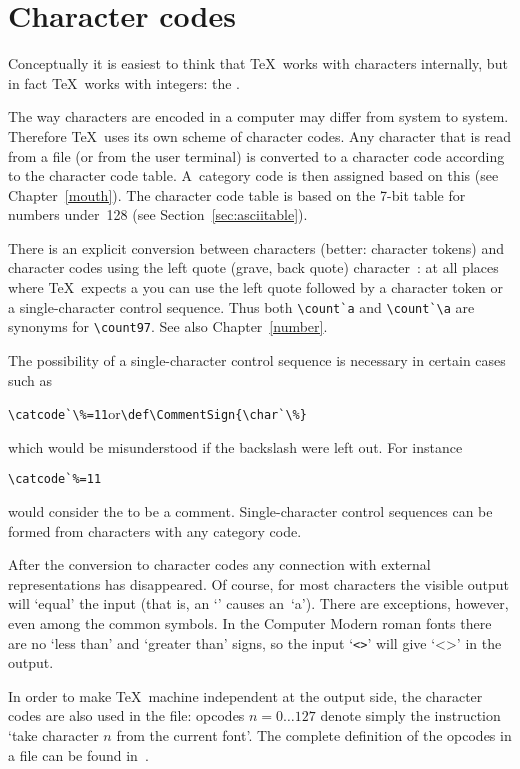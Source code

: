 \section{Character codes}
\label{char:code}

Conceptually it is easiest to think that \TeX\ works with
characters internally, but in fact
\TeX\ works with integers: the . 

The way characters are encoded in a computer may differ
from system to system.
Therefore \TeX\ uses its own scheme of character codes.
Any character that is read from a file (or from the user terminal)
is converted to a character code according to the
character code table.
A~category code is then assigned based on this (see Chapter~\ref{mouth}).
The character code table is based on the 7-bit \ascii{} table
for numbers under~128 (see Section~\ref{sec:asciitable}).

There is an explicit conversion between characters
(better:  character tokens)
and  character codes  using the left quote (grave, back quote)
character~:
at all places where \TeX\ expects a  you
can use the left quote followed by a character
token or
a single-character control sequence.
Thus both \verb.\count`a. and \verb.\count`\a. are synonyms
for \verb.\count97.. See also Chapter~\ref{number}.

The possibility of a single-character control
sequence is necessary in certain cases such as
\begin{disp}\verb>\catcode`\%=11>\quad or\quad \verb>\def\CommentSign{\char`\%}>\end{disp}
which would be misunderstood if the backslash were left out.
For instance
\begin{verbatim}
\catcode`%=11
\end{verbatim}
would consider
the  to be a comment.
Single-character
control sequences can be formed from characters with any
category code.

After the conversion to character codes any connection
with external representations has disappeared. Of course,
for most characters  the visible output will `equal' the input
(that is, an `' causes an~`a').
There are exceptions, however, even among the common symbols.
In the Computer Modern
roman fonts there are no `less than' and `greater than'
%
signs, so the input `\verb.<>.' will give `<>' in the output.

In order to make \TeX\ machine independent at the output
side, the character codes are also used in the  file:
opcodes $n=0\ldots127$ denote simply the instruction `take
character $n$ from the current font'. The complete definition
of the opcodes in a  file can be found in~\cite{Knuth:TeXprogram}.


